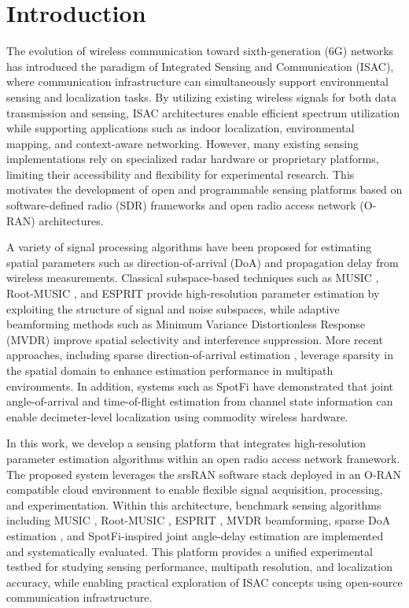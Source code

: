 \documentclass[conference]{IEEEtran}
\begin{document}
\section{Introduction}
The evolution of wireless communication toward sixth-generation (6G) networks has introduced the paradigm of Integrated Sensing and Communication (ISAC), where communication infrastructure can simultaneously support environmental sensing and localization tasks. By utilizing existing wireless signals for both data transmission and sensing, ISAC architectures enable efficient spectrum utilization while supporting applications such as indoor localization, environmental mapping, and context-aware networking. However, many existing sensing implementations rely on specialized radar hardware or proprietary platforms, limiting their accessibility and flexibility for experimental research. This motivates the development of open and programmable sensing platforms based on software-defined radio (SDR) frameworks and open radio access network (O-RAN) architectures.

A variety of signal processing algorithms have been proposed for estimating spatial parameters such as direction-of-arrival (DoA) and propagation delay from wireless measurements. Classical subspace-based techniques such as MUSIC \cite{1143830}, Root-MUSIC \cite{45540}, and ESPRIT \cite{32276} provide high-resolution parameter estimation by exploiting the structure of signal and noise subspaces, while adaptive beamforming methods such as Minimum Variance Distortionless Response (MVDR) \cite{articles} improve spatial selectivity and interference suppression. More recent approaches, including sparse direction-of-arrival estimation \cite{inbook}, leverage sparsity in the spatial domain to enhance estimation performance in multipath environments. In addition, systems such as SpotFi \cite{article} have demonstrated that joint angle-of-arrival and time-of-flight estimation from channel state information can enable decimeter-level localization using commodity wireless hardware.

In this work, we develop a sensing platform that integrates high-resolution parameter estimation algorithms within an open radio access network framework. The proposed system leverages the srsRAN \cite{srsran_docs} software stack deployed in an O-RAN compatible cloud environment to enable flexible signal acquisition, processing, and experimentation. Within this architecture, benchmark sensing algorithms including MUSIC \cite{1143830}, Root-MUSIC \cite{45540}, ESPRIT \cite{32276}, MVDR \cite{articles} beamforming, sparse DoA estimation \cite{inbook}, and \cite{article} SpotFi-inspired joint angle-delay estimation are implemented and systematically evaluated. This platform provides a unified experimental testbed for studying sensing performance, multipath resolution, and localization accuracy, while enabling practical exploration of ISAC concepts using open-source communication infrastructure.
\end{document}
